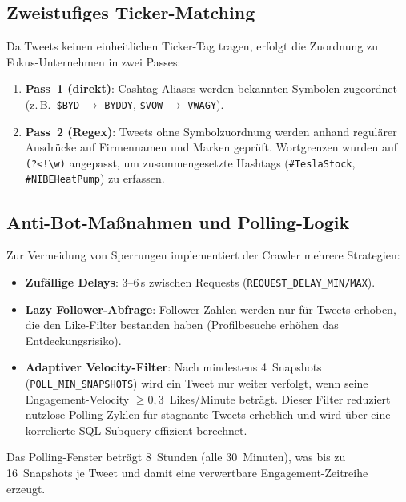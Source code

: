 \documentclass[11pt, a4paper]{article}
\begin{document}
\subsection{Zweistufiges Ticker-Matching}

Da Tweets keinen einheitlichen Ticker-Tag tragen, erfolgt die Zuordnung zu
Fokus-Unternehmen in zwei Passes:

\begin{enumerate}[noitemsep]
  \item \textbf{Pass~1 (direkt)}: Cashtag-Aliases werden bekannten Symbolen
        zugeordnet (z.\,B.\ \texttt{\$BYD} $\rightarrow$ \texttt{BYDDY},
        \texttt{\$VOW} $\rightarrow$ \texttt{VWAGY}).
  \item \textbf{Pass~2 (Regex)}: Tweets ohne Symbolzuordnung werden anhand
        regulärer Ausdrücke auf Firmennamen und Marken geprüft.
        Wortgrenzen wurden auf \texttt{(?<!\textbackslash w)} angepasst,
        um zusammengesetzte Hashtags (\texttt{\#TeslaStock},
        \texttt{\#NIBEHeatPump}) zu erfassen.
\end{enumerate}

\subsection{Anti-Bot-Maßnahmen und Polling-Logik}

Zur Vermeidung von Sperrungen implementiert der Crawler mehrere Strategien:

\begin{itemize}[noitemsep]
  \item \textbf{Zufällige Delays}: 3--6\,s zwischen Requests
        (\texttt{REQUEST\_DELAY\_MIN/MAX}).
  \item \textbf{Lazy Follower-Abfrage}: Follower-Zahlen werden nur für Tweets
        erhoben, die den Like-Filter bestanden haben (Profilbesuche erhöhen
        das Entdeckungsrisiko).
  \item \textbf{Adaptiver Velocity-Filter}: Nach mindestens 4~Snapshots
        (\texttt{POLL\_MIN\_SNAPSHOTS}) wird ein Tweet nur weiter verfolgt,
        wenn seine Engagement-Velocity $\geq 0{,}3$~Likes/Minute beträgt.
        Dieser Filter reduziert nutzlose Polling-Zyklen für stagnante Tweets
        erheblich und wird über eine korrelierte SQL-Subquery effizient berechnet.
\end{itemize}

Das Polling-Fenster beträgt 8~Stunden (alle 30~Minuten), was bis zu 16~Snapshots
je Tweet und damit eine verwertbare Engagement-Zeitreihe erzeugt.
\end{document}
